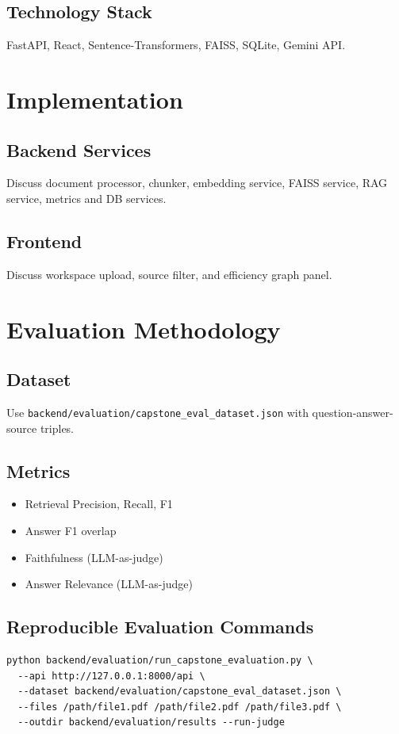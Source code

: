 \documentclass[12pt,a4paper]{report}
\begin{document}
\section{Technology Stack}
FastAPI, React, Sentence-Transformers, FAISS, SQLite, Gemini API.

\chapter{Implementation}
\section{Backend Services}
Discuss document processor, chunker, embedding service, FAISS service, RAG service, metrics and DB services.

\section{Frontend}
Discuss workspace upload, source filter, and efficiency graph panel.

\chapter{Evaluation Methodology}
\section{Dataset}
Use \texttt{backend/evaluation/capstone\_eval\_dataset.json} with question-answer-source triples.

\section{Metrics}
\begin{itemize}
  \item Retrieval Precision, Recall, F1
  \item Answer F1 overlap
  \item Faithfulness (LLM-as-judge)
  \item Answer Relevance (LLM-as-judge)
\end{itemize}

\section{Reproducible Evaluation Commands}
\begin{verbatim}
python backend/evaluation/run_capstone_evaluation.py \
  --api http://127.0.0.1:8000/api \
  --dataset backend/evaluation/capstone_eval_dataset.json \
  --files /path/file1.pdf /path/file2.pdf /path/file3.pdf \
  --outdir backend/evaluation/results --run-judge
\end{verbatim}
\end{document}
